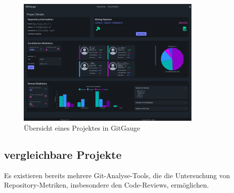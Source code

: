 \begin{figure}[htbp]
    \centering
    \includegraphics[width=0.8\textwidth]{Figures/giggauge-overview.png}
    \caption{Übersicht eines Projektes in GitGauge}
    \label{fig:gitgauge-project-overview}
\end{figure}

\newpage


\subsection{vergleichbare Projekte}
Es existieren bereits mehrere Git-Analyse-Tools, die die Untersuchung von Repository-Metriken, insbesondere den Code-Reviews, ermöglichen. 

